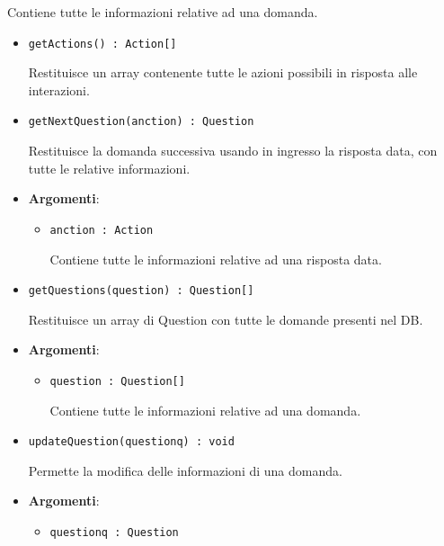 \documentclass[../DefinizioneDiProdotto.tex]{subfiles}
\begin{document}
\begin{itemize}
\begin{itemize}
\begin{itemize}
\begin{itemize}
	 Contiene tutte le informazioni relative ad una domanda.
	\end{itemize}
	\end{itemize}\vspace{0.5em}
	\begin{itemize}
	\item \texttt{getActions() : Action[]}\

	 Restituisce un array contenente tutte le azioni possibili in risposta alle interazioni.
	\end{itemize}\vspace{0.5em}
	\begin{itemize}
	\item \texttt{getNextQuestion(anction) : Question}\

	 Restituisce la domanda successiva usando in ingresso la risposta data, con tutte le relative informazioni.

	\item \textbf{Argomenti}:
	\begin{itemize}
	\item \texttt{anction : Action}\

	 Contiene tutte le informazioni relative ad una risposta data.
	\end{itemize}
	\end{itemize}\vspace{0.5em}
	\begin{itemize}
	\item \texttt{getQuestions(question) : Question[]}\

	 Restituisce un array di Question con tutte le domande presenti nel DB.

	\item \textbf{Argomenti}:
	\begin{itemize}
	\item \texttt{question : Question[]}\

	 Contiene tutte le informazioni relative ad una domanda.
	\end{itemize}
	\end{itemize}\vspace{0.5em}
	\begin{itemize}
	\item \texttt{updateQuestion(questionq) : void}\

	 Permette la modifica delle informazioni di una domanda.

	\item \textbf{Argomenti}:
	\begin{itemize}
	\item \texttt{questionq : Question}\


\end{itemize}
\end{itemize}
\end{itemize}
\end{itemize}
\end{document}
